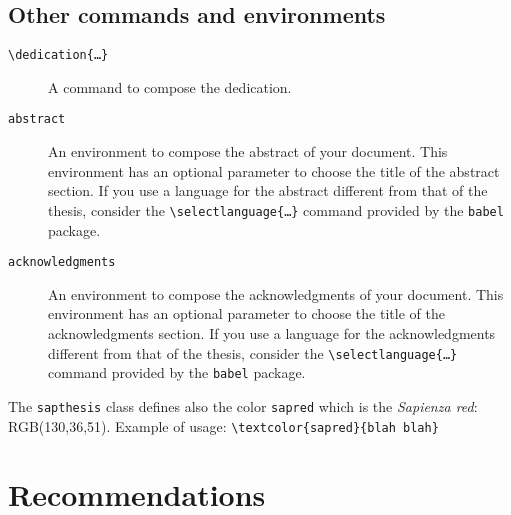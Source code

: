 \documentclass[a5paper,12pt]{article}
\newcommand{\bs}{\textbackslash}
\begin{document}
\subsection[Other commands\\ and environments]{Other commands and environments}

\begin{description}

\item[\texttt{\bs dedication\{\dots\}}] A command to compose the dedication.

\item[\texttt{abstract}] An environment to compose the abstract of your document. This environment has an optional parameter to choose the title of the abstract section.
If you use a language for the abstract different from that of the thesis, consider the \texttt{\bs selectlanguage\{\dots\}} command provided by the \texttt{babel} package.

\item[\texttt{acknowledgments}] An environment to compose the acknowledgments of your document. This environment has an optional parameter to choose the title of the acknowledgments section.
If you use a language for the acknowledgments different from that of the thesis, consider the \texttt{\bs selectlanguage\{\dots\}} command provided by the \texttt{babel} package.


\end{description}
\textcolor{sapred}{%
The \texttt{sapthesis} class defines also the color \texttt{sapred} which is the \emph{Sapienza red}: RGB(130,36,51). Example of usage: \texttt{\bs textcolor\{sapred\}\{blah blah\}}}


\section{Recommendations}
\end{document}

